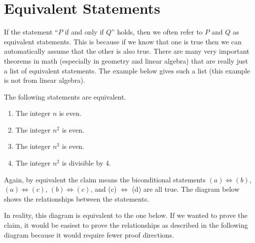 \section{Equivalent Statements}
If the statement ``$P$ if and only if $Q$'' holds, then we often refer to $P$ and $Q$ as equivalent statements.  This is because if we know that one is true then we can automatically assume that the other is also true.  There are many very important theorems in math (especially in geometry and linear algebra) that are really just a list of equivalent statements.  The example below gives such a list (this example is not from linear algebra).
\begin{claim}The following statements are equivalent.
	\begin{enumerate}[label=(\alph*)]
	\item The integer $n$ is even.
	\item The integer $n^2$ is even.
	\item The integer $n^3$ is even.
	\item The integer $n^2$ is divisible by 4.
	\end{enumerate}
\end{claim}
Again, by equivalent the claim means the biconditional statements $(a) \Leftrightarrow (b)$, $(a) \Leftrightarrow (c)$, $(b) \Leftrightarrow (c)$, and (c) $\Leftrightarrow$ (d) are all true.  The diagram below shows the relationships between the statements.

\begin{figure}[H]
\centering
{}
\end{figure}

In reality, this diagram is equivalent to the one below.  If we wanted to prove the claim, it would be easiest to prove the relationships as described in the following diagram because it would require fewer proof directions.

\begin{figure}[h]
\centering
{}
\end{figure}

